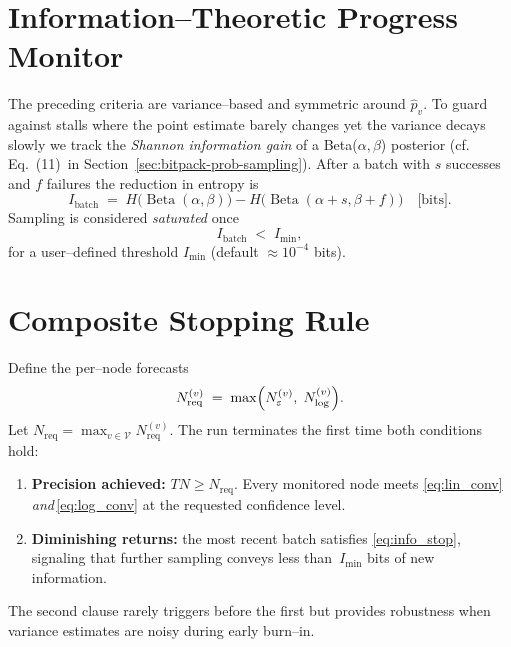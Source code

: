 \section{Information--Theoretic Progress Monitor}
\label{subsec:info_gain}

The preceding criteria are variance--based and symmetric around
$\widehat{p}_v$.  To guard against stalls where the point estimate barely
changes yet the variance decays slowly we track the \emph{Shannon information
gain} of a Beta($\alpha,\beta$) posterior (cf.
Eq.~(11)~in Section~\ref{sec:bitpack-prob-sampling}).  After a batch with
$s$ successes and $f$ failures the reduction in entropy is
\begin{equation}
  I_{\text{batch}}
  \;=\;
  H\bigl(\operatorname{Beta}(\alpha,\beta)\bigr)
  - H\bigl(\operatorname{Beta}(\alpha+s,\beta+f)\bigr)
  \quad\text{[bits]}.
  \label{eq:info_gain}
\end{equation}
Sampling is considered \emph{saturated} once
\begin{equation}
  I_{\text{batch}} \;<\; I_{\min},
  \label{eq:info_stop}
\end{equation}
for a user--defined threshold $I_{\min}$ (default $\approx 10^{-4}$ bits).

\section{Composite Stopping Rule}
\label{subsec:composite_rule}

Define the per--node forecasts
\begin{equation}
  N^{(v)}_{\text{req}} \;=\; \max\Bigl(N_{\varepsilon}^{(v)},\;N^{(v)}_{\log}\Bigr).
  \label{eq:n_req_node}
\end{equation}
Let $N_{\text{req}}=\max_{v\in\mathcal{V}}N^{(v)}_{\text{req}}$.  The run
terminates the first time both conditions hold:
\begin{enumerate}
  \item \textbf{Precision achieved:} $T N \ge N_{\text{req}}$.  Every monitored
        node meets \eqref{eq:lin_conv} \emph{and}\,\eqref{eq:log_conv} at the
        requested confidence level.
  \item \textbf{Diminishing returns:} the most recent batch satisfies
        \eqref{eq:info_stop}, signaling that further sampling conveys less
        than~$I_{\min}$ bits of new information.
\end{enumerate}
The second clause rarely triggers before the first but provides robustness
when variance estimates are noisy during early burn--in.

